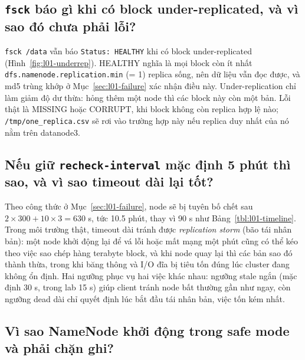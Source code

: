 \documentclass[
  12pt,
  a4paper,
]{report}
\begin{document}
\subsection{\texorpdfstring{\texttt{fsck} báo gì khi có block
under-replicated, và vì sao đó chưa phải
lỗi?}{fsck báo gì khi có block under-replicated, và vì sao đó chưa phải lỗi?}}\label{sec:l01-q5}

\texttt{fsck\ /data} vẫn báo \texttt{Status:\ HEALTHY} khi có block
under-replicated (Hình~\ref{fig:l01-underrep}). HEALTHY nghĩa là mọi
block còn ít nhất
\texttt{dfs.}\allowbreak{}\texttt{namenode.}\allowbreak{}\texttt{replication.}\allowbreak{}\texttt{min}\allowbreak{}
(= 1) replica sống, nên dữ liệu vẫn đọc được, và md5 trùng khớp ở
Mục~\ref{sec:l01-failure} xác nhận điều này. Under-replication chỉ làm
giảm độ dư thừa: hỏng thêm một node thì các block này còn một bản. Lỗi
thật là MISSING hoặc CORRUPT, khi block không còn replica hợp lệ nào;
\texttt{/}\allowbreak{}\texttt{tmp/}\allowbreak{}\texttt{one\_}\allowbreak{}\texttt{replica.}\allowbreak{}\texttt{csv}\allowbreak{}
sẽ rơi vào trường hợp này nếu replica duy nhất của nó nằm trên
datanode3.

\subsection{\texorpdfstring{Nếu giữ
\texttt{recheck-interval}\allowbreak{} mặc định 5 phút thì sao, và vì
sao timeout dài lại
tốt?}{Nếu giữ recheck-interval mặc định 5 phút thì sao, và vì sao timeout dài lại tốt?}}\label{sec:l01-q6}

Theo công thức ở Mục~\ref{sec:l01-failure}, node sẽ bị tuyên bố chết sau
\(2 \times 300 + 10 \times 3 = 630\) s, tức 10.5 phút, thay vì 90 s như
Bảng~\ref{tbl:l01-timeline}. Trong môi trường thật, timeout dài tránh
được \emph{replication storm} (bão tái nhân bản): một node khởi động lại
để vá lỗi hoặc mất mạng một phút cũng có thể kéo theo việc sao chép hàng
terabyte block, và khi node quay lại thì các bản sao đó thành thừa,
trong khi băng thông và I/O đĩa bị tiêu tốn đúng lúc cluster đang không
ổn định. Hai ngưỡng phục vụ hai việc khác nhau: ngưỡng stale ngắn (mặc
định 30 s, trong lab 15 s) giúp client tránh node bất thường gần như
ngay, còn ngưỡng dead dài chỉ quyết định lúc bắt đầu tái nhân bản, việc
tốn kém nhất.

\subsection{Vì sao NameNode khởi động trong safe mode và phải chặn
ghi?}\label{sec:l01-q7}
\end{document}
